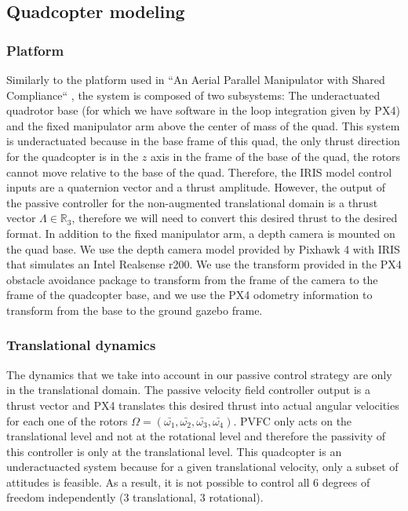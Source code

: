 \subsection{Quadcopter modeling}
\subsubsection{Platform}
Similarly to the platform used in ``An Aerial Parallel Manipulator with Shared Compliance`` \cite{Stephens2022}, the system is composed of two subsystems: The underactuated quadrotor base (for which we have software in the loop integration given by PX4) and the fixed manipulator arm above the center of mass of the quad.
This system is underactuated because in the base frame of this quad, the only thrust direction for the quadcopter is in the $z$ axis in the frame of the base of the quad, the rotors cannot move relative to the base of the quad. Therefore, the IRIS model control inputs are a quaternion vector and a thrust amplitude. However, the output of the passive controller for the non-augmented translational domain is a thrust vector $\Lambda \in\mathbb R_3 $, therefore we will need to convert this desired thrust to the desired format.
In addition to the fixed manipulator arm, a depth camera is mounted on the quad base. We use the depth camera model provided by Pixhawk 4 with IRIS that simulates an Intel Realsense r200. We use the transform provided in the PX4 obstacle avoidance package to transform from the frame of the camera to the frame of the quadcopter base, and we use the PX4 odometry information to transform from the base to the ground gazebo frame.

\subsubsection{Translational dynamics}

The dynamics that we take into account in our passive control strategy are only in the translational domain. The passive velocity field controller output is a thrust vector and PX4 translates this desired thrust into actual angular velocities for each one of the rotors 
$\Omega = (\bar{\omega_1}, \bar{\omega_2}, \bar{\omega_3}, \bar{\omega_4})$. PVFC only acts on the translational level and not at the rotational level and therefore the passivity of this controller is only at the translational level. 
This quadcopter is an underactuacted system because for a given translational velocity, only a subset of attitudes is feasible. As a result, it is not possible to control all 6 degrees of freedom independently (3 translational, 3 rotational).
 
